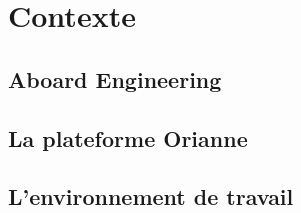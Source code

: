\chapter{Contexte}
\section{Aboard Engineering}
\lipsum

\section{La plateforme Orianne}
\lipsum

\section{L'environnement de travail}
\lipsum
